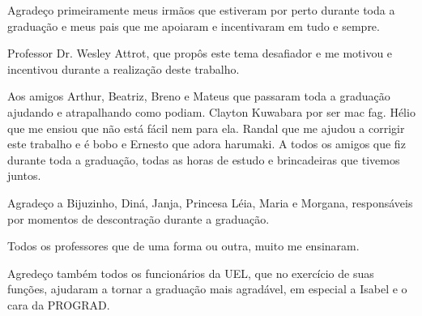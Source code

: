 \begin{agradecimentos}
Agradeço primeiramente meus irmãos que estiveram por perto durante toda
a graduação e meus pais que me apoiaram e incentivaram 
em tudo e sempre.
        
Professor Dr. Wesley Attrot, que propôs este tema desafiador e me motivou e 
incentivou durante a realização deste trabalho.

Aos amigos Arthur, Beatriz, Breno e Mateus que passaram toda a graduação ajudando e 
atrapalhando como podiam.
Clayton Kuwabara por ser mac fag. 
Hélio que me ensiou que não está fácil nem para ela. 
Randal que me ajudou a corrigir este trabalho e é bobo e 
Ernesto que adora harumaki.
A todos os amigos que fiz durante toda a graduação, todas as horas de estudo
e brincadeiras que tivemos juntos.

Agradeço a Bijuzinho, Diná, Janja, Princesa Léia, Maria e Morgana, responsáveis
por momentos de descontração durante a graduação.

Todos os professores que de uma forma ou outra, muito me ensinaram.

Agredeço também todos os funcionários da UEL, que no exercício de suas funções,
ajudaram a tornar a graduação mais agradável, em especial a Isabel e o cara da
PROGRAD.

\end{agradecimentos}
